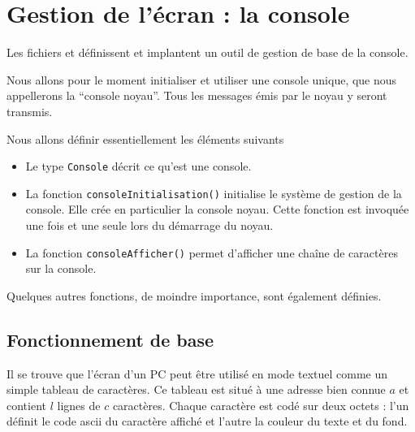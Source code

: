 %
\section{Gestion de l'écran : la console}

   Les fichiers  
et  définissent et implantent un outil de
gestion de base de la console.

   Nous allons pour le moment initialiser et utiliser une console
unique, que nous appellerons la ``console noyau''. Tous les messages
émis par le noyau y seront transmis.

   Nous allons définir essentiellement les éléments suivants

\begin{itemize}
   \item Le type \lstinline!Console! décrit ce qu'est une console.
   \item La fonction \lstinline!consoleInitialisation()! initialise le
     système de gestion de la console. Elle crée en particulier la
     console noyau. Cette fonction est invoquée une fois et une seule
     lors du démarrage du noyau.
   \item La fonction \lstinline!consoleAfficher()! permet d'afficher
     une chaîne de caractères sur la console.
\end{itemize}  

   Quelques autres fonctions, de moindre importance, sont également
définies.
   
%
\subsection{Fonctionnement de base}

   Il se trouve que l'écran d'un PC peut être utilisé en mode textuel
comme un simple tableau de caractères. Ce tableau est situé à une
adresse bien connue $a$ et contient $l$ lignes de $c$
caractères. Chaque caractère est codé sur deux octets : l'un définit
le code {\sc ascii} du caractère affiché et l'autre la couleur du
texte et du fond. 

%
